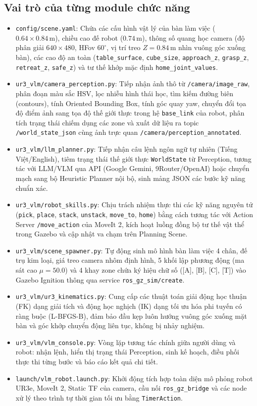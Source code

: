 \documentclass[a4paper,12pt]{article}
\begin{document}
\subsection{Vai trò của từng module chức năng}
\begin{itemize}
    \item \texttt{config/scene.yaml}: Chứa các cấu hình vật lý của bàn làm việc ($0.64\times 0.84\,\text{m}$), chiều cao đế robot ($0.74\,\text{m}$), thông số quang học camera (độ phân giải $640\times 480$, HFov $60^\circ$, vị trí treo $Z=0.84\,\text{m}$ nhìn vuông góc xuống bàn), các cao độ an toàn (\texttt{table\_surface}, \texttt{cube\_size}, \texttt{approach\_z}, \texttt{grasp\_z}, \texttt{retreat\_z}, \texttt{safe\_z}) và tư thế khớp mặc định \texttt{home\_joint\_values}.
    \item \texttt{ur3_vlm/camera_perception.py}: Tiếp nhận ảnh thô từ \texttt{/camera/image\_raw}, phân đoạn màu sắc HSV, lọc nhiễu hình thái học, tìm kiếm đường biên (contours), tính Oriented Bounding Box, tính góc quay yaw, chuyển đổi tọa độ điểm ảnh sang tọa độ thế giới thực trong hệ \texttt{base\_link} của robot, phân tích trạng thái chiếm dụng các zone và xuất dữ liệu ra topic \texttt{/world\_state\_json} cùng ảnh trực quan \texttt{/camera/perception\_annotated}.
    \item \texttt{ur3_vlm/llm_planner.py}: Tiếp nhận câu lệnh ngôn ngữ tự nhiên (Tiếng Việt/English), tiêm trạng thái thế giới thực \texttt{WorldState} từ Perception, tương tác với LLM/VLM qua API (Google Gemini, 9Router/OpenAI) hoặc chuyển mạch sang bộ Heuristic Planner nội bộ, sinh mảng JSON các bước kỹ năng chuẩn xác.
    \item \texttt{ur3_vlm/robot_skills.py}: Chịu trách nhiệm thực thi các kỹ năng nguyên tử (\texttt{pick}, \texttt{place}, \texttt{stack}, \texttt{unstack}, \texttt{move\_to}, \texttt{home}) bằng cách tương tác với Action Server \texttt{/move\_action} của MoveIt 2, kích hoạt luồng đồng bộ tư thế vật thể trong Gazebo và cập nhật va chạm trên Planning Scene.
    \item \texttt{ur3_vlm/scene_spawner.py}: Tự động sinh mô hình bàn làm việc 4 chân, đế trụ kim loại, giá treo camera nhôm định hình, 5 khối lập phương động (ma sát cao $\mu=50.0$) và 4 khay zone chứa ký hiệu chữ số ([A], [B], [C], [T]) vào Gazebo Ignition thông qua service \texttt{ros\_gz\_sim/create}.
    \item \texttt{ur3_vlm/ur3_kinematics.py}: Cung cấp các thuật toán giải động học thuận (FK) dạng giải tích và động học nghịch (IK) dạng tối ưu hóa phi tuyến có ràng buộc (L-BFGS-B), đảm bảo đầu kẹp luôn hướng vuông góc xuống mặt bàn và góc khớp chuyển động liên tục, không bị nhảy nghiệm.
    \item \texttt{ur3_vlm/vlm_console.py}: Vòng lặp tương tác chính giữa người dùng và robot: nhận lệnh, hiển thị trạng thái Perception, sinh kế hoạch, điều phối thực thi từng bước và báo cáo kết quả chi tiết.
    \item \texttt{launch/vlm_robot.launch.py}: Khởi động tích hợp toàn diện mô phỏng robot UR3e, MoveIt 2, Static TF của camera, cầu nối \texttt{ros\_gz\_bridge} và các node xử lý theo trình tự thời gian tối ưu bằng \texttt{TimerAction}.
\end{itemize}
\end{document}
